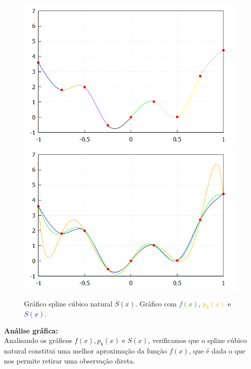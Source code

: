 \documentclass{article}
\begin{document}
\begin{figure}[H]
  \begin{center}
  \includegraphics[scale = 0.35]{./image5.png}
  \includegraphics[scale = 0.35]{./image6.png}
  \caption*{Gráfico spline cúbico natural $S(x)$. \hspace{25mm} Gráfico com \textcolor{green}{$f(x)$}, \textcolor{orange}{$p_8(x)$} e \textcolor{blue}{$S(x)$}.}
\end{center}
\end{figure}
\begin{flushleft}
  \textbf{Análise gráfica:} \\
  Analisando os gráficos $f(x), p_{8}(x)$ e $S(x)$, verificamos que o spline cúbico natural constitui uma melhor aproximação da função $f(x)$, que é dada o que nos permite retirar uma observação direta.
\end{flushleft}
\end{document}
